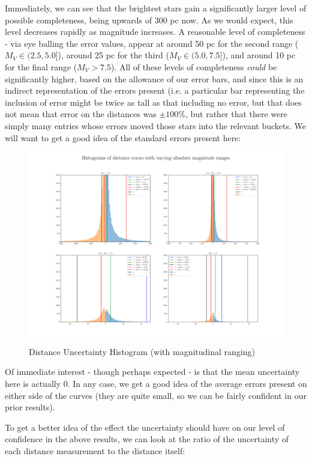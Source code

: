 \documentclass{business-covered} %
\begin{document}
		Immediately, we can see that the brightest stars gain a significantly larger level of possible completeness, being upwards of 300 pc now. As we would expect, this level decreases rapidly as magnitude increases. A reasonable level of completeness - via eye balling the error values, appear at around 50 pc for the second range ($M_V \in (2.5,5.0]$), around 25 pc for the third ($M_V \in (5.0,7.5]$), and around 10 pc for the final range ($M_V > 7.5$). All of these levels of completeness \textit{could} be significantly higher, based on the allowance of our error bars, and since this is an indirect representation of the errors present (i.e. a particular bar representing the inclusion of error might be twice as tall as that including no error, but that does not mean that error on the distances was $\pm 100\%$, but rather that there were simply many entries whose errors moved those stars into the relevant buckets. 
\pagebreak		
		We will want to get a good idea of the standard errors present here:	
		
		\begin{figure}[h!]
			\includegraphics[scale=.33]{figures/e_Dist_hist.png}
			\caption{Distance Uncertainty Histogram (with magnitudinal ranging)}
		\end{figure}

		Of immediate interest - though perhaps expected - is that the mean uncertainty here is actually 0. In any case, we get a good idea of the average errors present on either side of the curves (they are quite small, so we can be fairly confident in our prior results). 
		
\pagebreak		
		To get a better idea of the effect the uncertainty should have on our level of confidence in the above results, we can look at the ratio of the uncertainty of each distance measurement to the distance itself:
		
\end{document}

